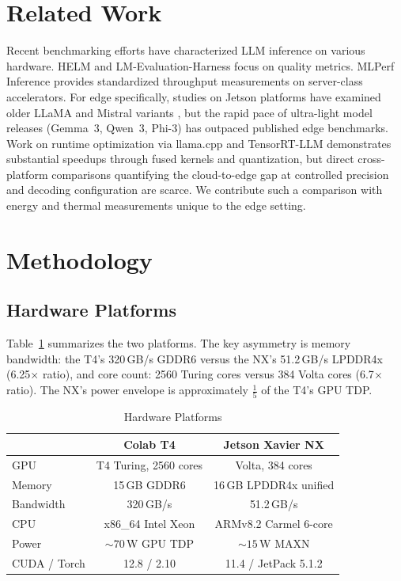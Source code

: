 \documentclass[conference]{IEEEtran}
\begin{document}
\section{Related Work}
Recent benchmarking efforts have characterized LLM inference on various hardware. HELM \cite{helm} and LM-Evaluation-Harness \cite{lmeval} focus on quality metrics. MLPerf Inference \cite{mlperf} provides standardized throughput measurements on server-class accelerators. For edge specifically, studies on Jetson platforms have examined older LLaMA and Mistral variants \cite{jetsonllama}, but the rapid pace of ultra-light model releases (Gemma~3, Qwen~3, Phi-3) has outpaced published edge benchmarks. Work on runtime optimization via llama.cpp \cite{llamacpp} and TensorRT-LLM \cite{tensorrtllm} demonstrates substantial speedups through fused kernels and quantization, but direct cross-platform comparisons quantifying the cloud-to-edge gap at controlled precision and decoding configuration are scarce. We contribute such a comparison with energy and thermal measurements unique to the edge setting.

\section{Methodology}

\subsection{Hardware Platforms}
Table~\ref{tab:hw} summarizes the two platforms. The key asymmetry is memory bandwidth: the T4's 320\,GB/s GDDR6 versus the NX's 51.2\,GB/s LPDDR4x (6.25$\times$ ratio), and core count: 2560 Turing cores versus 384 Volta cores (6.7$\times$ ratio). The NX's power envelope is approximately $\frac{1}{5}$ of the T4's GPU TDP.

\begin{table}[t]
\caption{Hardware Platforms}
\label{tab:hw}
\centering
\renewcommand{\arraystretch}{1.15}
\begin{tabular}{lcc}
\toprule
 & \textbf{Colab T4} & \textbf{Jetson Xavier NX} \\
\midrule
GPU            & T4 Turing, 2560 cores  & Volta, 384 cores \\
Memory         & 15\,GB GDDR6           & 16\,GB LPDDR4x unified \\
Bandwidth      & 320\,GB/s              & 51.2\,GB/s \\
CPU            & x86\_64 Intel Xeon     & ARMv8.2 Carmel 6-core \\
Power          & ${\sim}70$\,W GPU TDP  & ${\sim}15$\,W MAXN \\
CUDA / Torch   & 12.8 / 2.10            & 11.4 / JetPack 5.1.2 \\
\bottomrule
\end{tabular}
\end{table}
\end{document}
